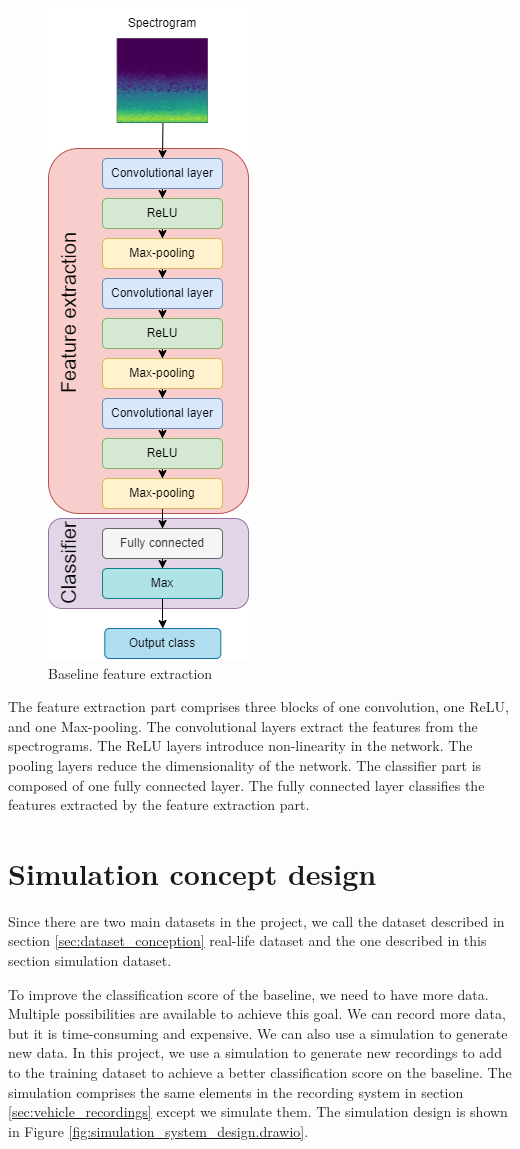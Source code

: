 \begin{figure}[H]
    \centering
    \includegraphics[width=.25\textwidth]{../Images/cnn_architecture_design.drawio.png}
    \caption{Baseline feature extraction}
    \label{fig:baseline_feature_extraction}
\end{figure}

The feature extraction part comprises three blocks of one convolution, one ReLU, and one Max-pooling. The convolutional layers extract the features from the spectrograms. The ReLU layers introduce non-linearity in the network. The pooling layers reduce the dimensionality of the network. The classifier part is composed of one fully connected layer. The fully connected layer classifies the features extracted by the feature extraction part. 

\section{Simulation concept design}
\label{sec:simulation_concept_design}

Since there are two main datasets in the project, we call the dataset described in section \ref{sec:dataset_conception} real-life dataset and the one described in this section simulation dataset. 

To improve the classification score of the baseline, we need to have more data. Multiple possibilities are available to achieve this goal. We can record more data, but it is time-consuming and expensive. We can also use a simulation to generate new data. In this project, we use a simulation to generate new recordings to add to the training dataset to achieve a better classification score on the baseline. The simulation comprises the same elements in the recording system in section \ref{sec:vehicle_recordings} except we simulate them. The simulation design is shown in Figure \ref{fig:simulation_system_design.drawio}.


